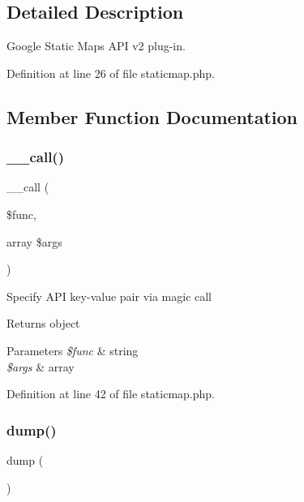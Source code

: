 \subsection{Detailed Description}
Google Static Maps A\+PI v2 plug-\/in. 

Definition at line 26 of file staticmap.\+php.



\subsection{Member Function Documentation}
\hypertarget{class_web_1_1_google_1_1_static_map_a975d2c46a134129eb727fadcadf48adf}{}\label{class_web_1_1_google_1_1_static_map_a975d2c46a134129eb727fadcadf48adf} 
\subsubsection{\texorpdfstring{\+\_\+\+\_\+call()}{\_\_call()}}
{\footnotesize\ttfamily \+\_\+\+\_\+call (\begin{DoxyParamCaption}\item[{}]{\$func,  }\item[{array}]{\$args }\end{DoxyParamCaption})}

Specify A\+PI key-\/value pair via magic call \begin{DoxyReturn}{Returns}
object 
\end{DoxyReturn}

\begin{DoxyParams}{Parameters}
{\em \$func} & string \\
\hline
{\em \$args} & array \\
\hline
\end{DoxyParams}


Definition at line 42 of file staticmap.\+php.

\hypertarget{class_web_1_1_google_1_1_static_map_a5bf63e4ac70cfd9d97e3f2eab936ec8b}{}\label{class_web_1_1_google_1_1_static_map_a5bf63e4ac70cfd9d97e3f2eab936ec8b} 
\subsubsection{\texorpdfstring{dump()}{dump()}}
{\footnotesize\ttfamily dump (\begin{DoxyParamCaption}{ }\end{DoxyParamCaption})}

